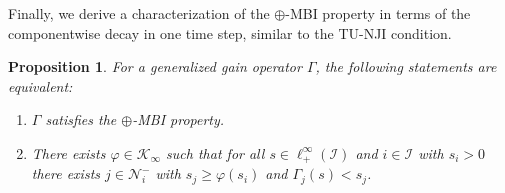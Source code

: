 \documentclass[10pt, oneside, a4paper]{article}
\newcommand{\IC}{\mathcal{I}}
\newcommand{\KC}{\mathcal{K}}
\newcommand{\NC}{\mathcal{N}}
\newtheorem{proposition}{Proposition}[section]
\begin{document}
Finally, we derive a characterization of the $\oplus$-MBI property in terms of the componentwise decay in one time step, similar to the TU-NJI condition.%

\begin{proposition}\label{prop_maxmbi_nji_char}
For a generalized gain operator $\Gamma$, the following statements are equivalent:%
\begin{enumerate}
\item[(a)] $\Gamma$ satisfies the $\oplus$-MBI property.%
\item[(b)] There exists $\varphi \in \KC_{\infty}$ such that for all $s \in \ell^{\infty}_+(\IC)$ and $i \in \IC$ with $s_i > 0$ there exists $j \in \NC^-_i$ with $s_j \geq \varphi(s_i)$ and $\Gamma_j(s) < s_j$.
\end{enumerate}
\end{proposition}
\end{document}
